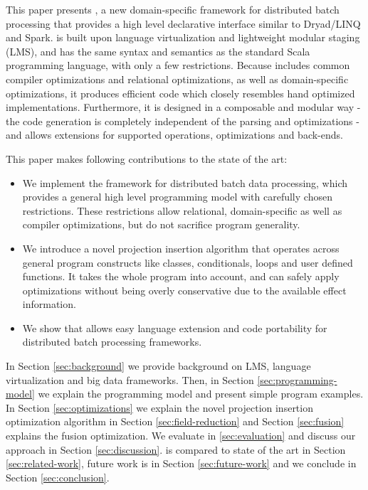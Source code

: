 This paper presents \tool, a new domain-specific framework for distributed batch
processing that provides a high level declarative interface similar to
Dryad/LINQ and Spark. \tool is built upon language virtualization
\cite{moors_scala-virtualized_2012} and lightweight modular staging
\cite{rompf_lightweight_2010} (LMS), and has the same syntax and semantics as the
standard Scala programming language, with only a few restrictions.
Because \tool includes common compiler optimizations and relational optimizations, as well as
domain-specific optimizations, it produces efficient code which closely resembles hand
optimized implementations.
Furthermore, it is designed in a composable and modular way - the code generation is
completely independent of the parsing and optimizations - and allows extensions
for supported operations, optimizations and back-ends.

This paper makes following contributions to the state of the art:
\begin{itemize}

  \item We implement the \tool framework for distributed batch data
  processing, which provides a general high level programming model with carefully
  chosen restrictions. These restrictions allow relational, domain-specific as well as
  compiler optimizations, but do not sacrifice program generality.

  \item We introduce a novel projection insertion algorithm that operates across
  general program constructs like classes, conditionals, loops and user defined
  functions. It takes the whole program into account, and can safely apply optimizations 
  without being overly conservative due to the available effect information.

  \item We show that \tool allows easy language extension and code portability
  for distributed batch processing frameworks.

\end{itemize} 

In Section \ref{sec:background} we provide background on LMS,
language virtualization and big data frameworks. Then, in Section
\ref{sec:programming-model} we explain the programming model and present simple
program examples. In Section \ref{sec:optimizations} we explain the novel
projection insertion optimization algorithm in Section \ref{sec:field-reduction}
and Section \ref{sec:fusion} explains the fusion optimization. We evaluate \tool
in \ref{sec:evaluation} and discuss our approach in Section
\ref{sec:discussion}. \tool is compared to state of the art in Section
\ref{sec:related-work}, future work is in Section \ref{sec:future-work} and we
conclude in Section \ref{sec:conclusion}.
